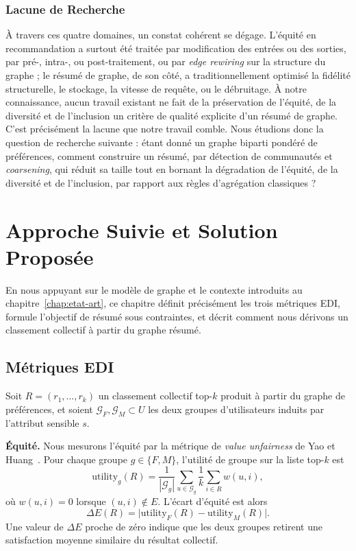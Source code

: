 \documentclass[12pt]{report}
\begin{document}
\subsection{Lacune de Recherche}

À travers ces quatre domaines, un constat cohérent se dégage. L'équité en
recommandation a surtout été traitée par modification des entrées ou des
sorties, par pré-, intra-, ou post-traitement, ou par \emph{edge
rewiring} sur la structure du graphe ; le résumé de graphe, de son côté,
a traditionnellement optimisé la fidélité structurelle, le stockage, la
vitesse de requête, ou le débruitage. À notre connaissance, aucun travail
existant ne fait de la préservation de l'équité, de la diversité et de
l'inclusion un critère de qualité explicite d'un résumé de graphe. C'est
précisément la lacune que notre travail comble. Nous étudions donc la
question de recherche suivante : étant donné un graphe biparti pondéré de
préférences, comment construire un résumé, par détection de communautés
et \emph{coarsening}, qui réduit sa taille tout en bornant la dégradation
de l'équité, de la diversité et de l'inclusion, par rapport aux règles
d'agrégation classiques ?

\chapter{Approche Suivie et Solution Proposée}
\label{chap:approche}
\label{sec:methodology}

En nous appuyant sur le modèle de graphe et le contexte introduits au
chapitre~\ref{chap:etat-art}, ce chapitre définit précisément les trois
métriques EDI, formule l'objectif de résumé sous contraintes, et décrit
comment nous dérivons un classement collectif à partir du graphe résumé.

\section{Métriques EDI}

Soit $R = (r_1, \ldots, r_k)$ un classement collectif top-$k$ produit à
partir du graphe de préférences, et soient $\mathcal{G}_F, \mathcal{G}_M
\subset U$ les deux groupes d'utilisateurs induits par l'attribut sensible
$s$.

\smallskip\noindent\textbf{Équité.}
Nous mesurons l'équité par la métrique de \emph{value unfairness} de Yao
et Huang~\cite{yao_new_2017}. Pour chaque groupe $g \in \{F, M\}$,
l'utilité de groupe sur la liste top-$k$ est
\begin{equation}
  \mathrm{utility}_g(R)
    = \frac{1}{|\mathcal{G}_g|}
      \sum_{u \in \mathcal{G}_g}
      \frac{1}{k} \sum_{i \in R} w(u, i),
\end{equation}
où $w(u,i)=0$ lorsque $(u,i)\notin E$. L'écart d'équité est alors
\begin{equation}
  \Delta E(R) = \bigl|\mathrm{utility}_F(R) - \mathrm{utility}_M(R)\bigr|.
\end{equation}
Une valeur de $\Delta E$ proche de zéro indique que les deux groupes
retirent une satisfaction moyenne similaire du résultat collectif.
\end{document}
